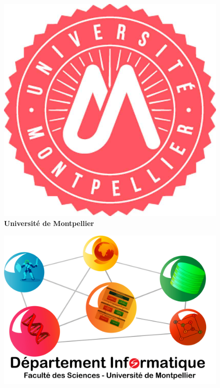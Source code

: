 \documentclass[12pt,a4paper]{report}
\begin{document}
\justifying

\begin{titlepage}
\begin{center}

\vspace*{0.5cm}
\begin{minipage}{0.3\textwidth}
    \centering
    \includegraphics[width=0.85\textwidth]{Assets/UM.png}\\[0.2cm]
    {\footnotesize\textbf{Université de Montpellier}}
\end{minipage}
\hfill
\begin{minipage}{0.3\textwidth}
    \centering
    \includegraphics[width=0.85\textwidth]{Assets/Dpt_Info.png}\\[0.2cm]

\end{minipage}
\end{center}
\end{titlepage}
\end{document}
